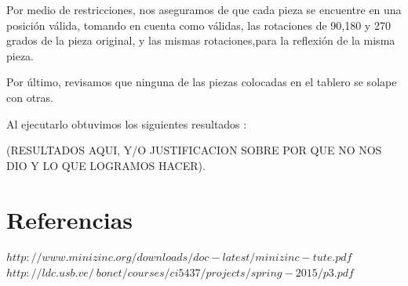 \documentclass{article}
\begin{document}
Por medio de restricciones, nos aseguramos de que cada pieza se encuentre en una posición válida, tomando en cuenta como válidas, las rotaciones de 90,180 y 270 grados de la pieza original, y las mismas rotaciones,para la reflexión de la misma pieza. \par


Por último, revisamos que ninguna de las piezas colocadas en el tablero se solape con otras. \par


Al ejecutarlo obtuvimos los siguientes resultados : \par


(RESULTADOS AQUI, Y/O JUSTIFICACION SOBRE POR QUE NO NOS DIO Y LO QUE LOGRAMOS HACER).\par


\clearpage

\section{Referencias}


$http://www.minizinc.org/downloads/doc-latest/minizinc-tute.pdf$
$http://ldc.usb.ve/~bonet/courses/ci5437/projects/spring-2015/p3.pdf$
\end{document}

